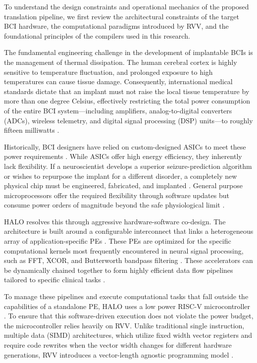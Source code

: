 To understand the design constraints and operational mechanics of the proposed translation pipeline, we first review the architectural constraints of the target BCI hardware, the computational paradigms introduced by RVV, and the foundational principles of the compilers used in this research. 

The fundamental engineering challenge in the development of implantable BCIs is the management of thermal dissipation. The human cerebral cortex is highly sensitive to temperature fluctuation, and prolonged exposure to high temperatures can cause tissue damage. Consequently, international medical standards dictate that an implant must not raise the local tissue temperature by more than one degree Celsius, effectively restricting the total power consumption of the entire BCI system—including amplifiers, analog-to-digital converters (ADCs), wireless telemetry, and digital signal processing (DSP) units—to roughly fifteen milliwatts \cite{10120914}.

Historically, BCI designers have relied on custom-designed ASICs to meet these power requirements \cite{7982670} \cite{Musk2019} \cite{Heck2014}. While ASICs offer high energy efficiency, they inherently lack flexibility. If a neuroscientist develops a superior seizure-prediction algorithm or wishes to repurpose the implant for a different disorder, a completely new physical chip must be engineered, fabricated, and implanted \cite{9138938}. General purpose microprocessors offer the required flexibility through software updates but consume power orders of magnitude beyond the safe physiological limit \cite{10120914}.

HALO resolves this through aggressive hardware-software co-design. The architecture is built around a configurable interconnect that links a heterogeneous array of application-specific PEs \cite{9138938}. These PEs are optimized for the specific computational  kernels most frequently encountered in neural signal processing, such as FFT, XCOR, and Butterworth bandpass filtering \cite{10120914}. These accelerators can be dynamically chained together to form highly efficient data flow pipelines tailored to specific clinical tasks \cite{9138938}.

To manage these pipelines and execute computational tasks that fall outside the capabilities of a standalone PE, HALO uses a low power RISC-V microcontroller \cite{9138938}. To ensure that this software-driven execution does not violate the power budget, the microcontroller relies heavily on RVV. Unlike traditional single instruction, multiple data (SIMD) architectures, which utilize fixed width vector registers and require code rewrites when the vector width changes for different hardware generations, RVV introduces a vector-length agnostic programming model \cite{pipicelli2020quantum, Ibanez}.

